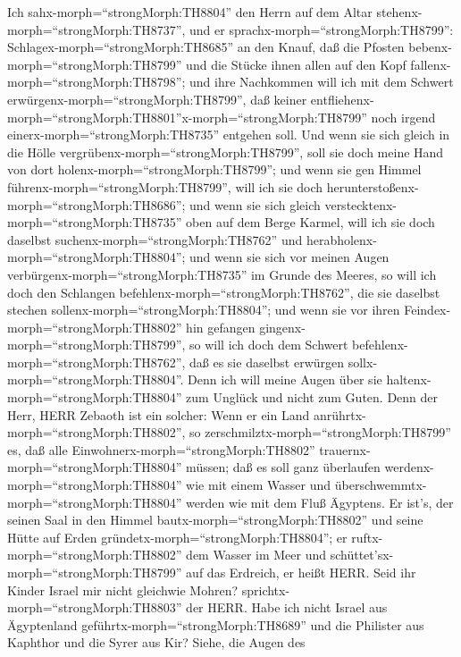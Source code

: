  Ich sahx-morph=``strongMorph:TH8804'' den Herrn auf dem
Altar stehenx-morph=``strongMorph:TH8737'', und er
sprachx-morph=``strongMorph:TH8799'':
Schlagex-morph=``strongMorph:TH8685'' an den Knauf, daß die Pfosten
bebenx-morph=``strongMorph:TH8799'' und die Stücke ihnen allen auf den
Kopf fallenx-morph=``strongMorph:TH8798''; und ihre Nachkommen will ich
mit dem Schwert erwürgenx-morph=``strongMorph:TH8799'', daß keiner
entfliehenx-morph=``strongMorph:TH8801''x-morph=``strongMorph:TH8799''
noch irgend einerx-morph=``strongMorph:TH8735'' entgehen soll.
 Und wenn sie sich gleich in die Hölle
vergrübenx-morph=``strongMorph:TH8799'', soll sie doch meine Hand von
dort holenx-morph=``strongMorph:TH8799''; und wenn sie gen Himmel
führenx-morph=``strongMorph:TH8799'', will ich sie doch
herunterstoßenx-morph=``strongMorph:TH8686'';  und wenn sie
sich gleich verstecktenx-morph=``strongMorph:TH8735'' oben auf dem Berge
Karmel, will ich sie doch daselbst suchenx-morph=``strongMorph:TH8762''
und herabholenx-morph=``strongMorph:TH8804''; und wenn sie sich vor
meinen Augen verbürgenx-morph=``strongMorph:TH8735'' im Grunde des
Meeres, so will ich doch den Schlangen
befehlenx-morph=``strongMorph:TH8762'', die sie daselbst stechen
sollenx-morph=``strongMorph:TH8804'';  und wenn sie vor
ihren Feindex-morph=``strongMorph:TH8802'' hin gefangen
gingenx-morph=``strongMorph:TH8799'', so will ich doch dem Schwert
befehlenx-morph=``strongMorph:TH8762'', daß es sie daselbst erwürgen
sollx-morph=``strongMorph:TH8804''. Denn ich will meine Augen über sie
haltenx-morph=``strongMorph:TH8804'' zum Unglück und nicht zum Guten.
 Denn der Herr, HERR Zebaoth ist ein solcher: Wenn er ein
Land anrührtx-morph=``strongMorph:TH8802'', so
zerschmilztx-morph=``strongMorph:TH8799'' es, daß alle
Einwohnerx-morph=``strongMorph:TH8802''
trauernx-morph=``strongMorph:TH8804'' müssen; daß es soll ganz
überlaufen werdenx-morph=``strongMorph:TH8804'' wie mit einem Wasser und
überschwemmtx-morph=``strongMorph:TH8804'' werden wie mit dem Fluß
Ägyptens.  Er ist's, der seinen Saal in den Himmel
bautx-morph=``strongMorph:TH8802'' und seine Hütte auf Erden
gründetx-morph=``strongMorph:TH8804''; er
ruftx-morph=``strongMorph:TH8802'' dem Wasser im Meer und
schüttet'sx-morph=``strongMorph:TH8799'' auf das Erdreich, er heißt
HERR.  Seid ihr Kinder Israel mir nicht gleichwie Mohren?
sprichtx-morph=``strongMorph:TH8803'' der HERR. Habe ich nicht Israel
aus Ägyptenland geführtx-morph=``strongMorph:TH8689'' und die Philister
aus Kaphthor und die Syrer aus Kir?  Siehe, die Augen des
